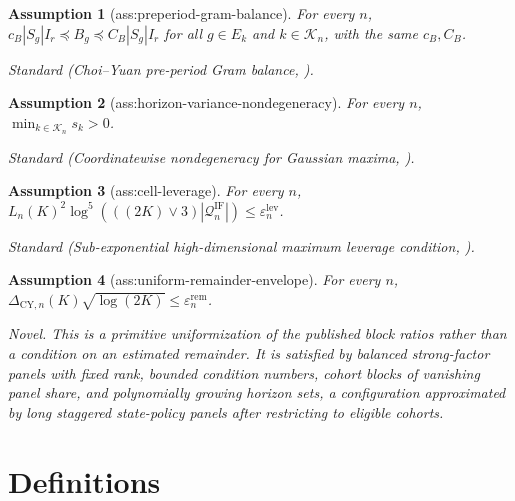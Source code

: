 \documentclass{article}
\newtheorem{assumption}{Assumption}
\begin{document}
\begin{assumption}[ass:preperiod-gram-balance]\label{ass:preperiod-gram-balance}
For every \(n\), \(c_B|S_g|I_r\preceq B_g\preceq C_B|S_g|I_r\) for all \(g\in E_k\) and \(k\in\mathcal K_n\), with the same \(c_B,C_B\).
\par\smallskip\noindent\emph{Standard} (Choi--Yuan pre-period Gram balance, \cite{ChoiYuan2024MNAR}).
\end{assumption}

\begin{assumption}[ass:horizon-variance-nondegeneracy]\label{ass:horizon-variance-nondegeneracy}
For every \(n\), \(\min_{k\in\mathcal K_n}s_k>0\).
\par\smallskip\noindent\emph{Standard} (Coordinatewise nondegeneracy for Gaussian maxima, \cite{ChernozhukovChetverikovKato2013Maxima}).
\end{assumption}

\begin{assumption}[ass:cell-leverage]\label{ass:cell-leverage}
For every \(n\), \(L_n(K)^2\log^5(((2K)\vee3)|\mathcal Q_n^{\mathrm{IF}}|)\le\varepsilon_n^{\mathrm{lev}}\).
\par\smallskip\noindent\emph{Standard} (Sub-exponential high-dimensional maximum leverage condition, \cite{ChernozhukovChetverikovKoike2023NearlyOptimal}).
\end{assumption}

\begin{assumption}[ass:uniform-remainder-envelope]\label{ass:uniform-remainder-envelope}
For every \(n\), \(\Delta_{\mathrm{CY},n}(K)\sqrt{\log(2K)}\le\varepsilon_n^{\mathrm{rem}}\).
\par\smallskip\noindent\emph{Novel.} This is a primitive uniformization of the published block ratios rather than a condition on an estimated remainder. It is satisfied by balanced strong-factor panels with fixed rank, bounded condition numbers, cohort blocks of vanishing panel share, and polynomially growing horizon sets, a configuration approximated by long staggered state-policy panels after restricting to eligible cohorts.
\end{assumption}

\section{Definitions}
\end{document}
